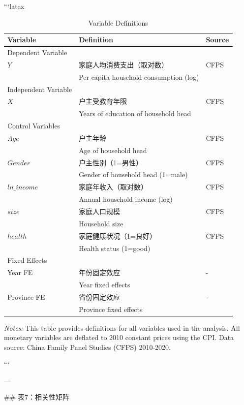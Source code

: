 ```latex
\begin{table}[htbp]
\centering
\caption{Variable Definitions}
\label{tab:var_def}
\scriptsize
\begin{tabular}{lll}
\toprule
Variable & Definition & Source \\
\midrule
Dependent Variable & & \\
$Y$ & 家庭人均消费支出（取对数） & CFPS \\
 & Per capita household consumption (log) & \\
\midrule
Independent Variable & & \\
$X$ & 户主受教育年限 & CFPS \\
 & Years of education of household head & \\
\midrule
Control Variables & & \\
$Age$ & 户主年龄 & CFPS \\
 & Age of household head & \\
$Gender$ & 户主性别（1=男性） & CFPS \\
 & Gender of household head (1=male) & \\
$ln\_income$ & 家庭年收入（取对数） & CFPS \\
 & Annual household income (log) & \\
$size$ & 家庭人口规模 & CFPS \\
 & Household size & \\
$health$ & 家庭健康状况（1=良好） & CFPS \\
 & Health status (1=good) & \\
\midrule
Fixed Effects & & \\
Year FE & 年份固定效应 & - \\
 & Year fixed effects & \\
Province FE & 省份固定效应 & - \\
 & Province fixed effects & \\
\bottomrule
\end{tabular}
\begin{minipage}{\linewidth}
\smallskip
\textit{Notes:} This table provides definitions for all variables used in the analysis. All monetary variables are deflated to 2010 constant prices using the CPI. Data source: China Family Panel Studies (CFPS) 2010-2020.
\end{minipage}
\end{table}
```

---

## 表7：相关性矩阵


